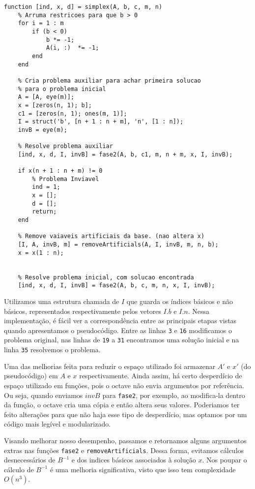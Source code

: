 \documentclass[12pt]{article}
\begin{document}
    \begin{lstlisting}
function [ind, x, d] = simplex(A, b, c, m, n)
    % Arruma restricoes para que b > 0
    for i = 1 : m
        if (b < 0)
            b *= -1;
            A(i, :)  *= -1;
        end
    end

    % Cria problema auxiliar para achar primeira solucao 
    % para o problema inicial
    A = [A, eye(m)];
    x = [zeros(n, 1); b];
    c1 = [zeros(n, 1); ones(m, 1)];
    I = struct('b', [n + 1 : n + m], 'n', [1 : n]);
    invB = eye(m);

    % Resolve problema auxiliar
    [ind, x, d, I, invB] = fase2(A, b, c1, m, n + m, x, I, invB);

    if x(n + 1 : n + m) != 0
        % Problema Inviavel
        ind = 1;
        x = [];
        d = [];
        return;
    end

    % Remove vaiaveis artificiais da base. (nao altera x)
    [I, A, invB, m] = removeArtificials(A, I, invB, m, n, b);
    x = x(1 : n);


    % Resolve problema inicial, com solucao encontrada
    [ind, x, d, I, invB] = fase2(A, b, c, m, n, x, I, invB);
    \end{lstlisting}

	
	Utilizamos uma estrutura chamada de $I$ que guarda os índices básicos e não básicos, representados respectivamente pelos vetores $I.b$ e $I.n$. Nessa implementação, é fácil ver a correspondência entre as principais etapas vistas quando apresentamos o pseudocódigo. Entre as linhas \texttt{3} e \texttt{16} modificamos o problema original, nas linhas de \texttt{19} a \texttt{31} encontramos uma solução inicial e na linha \texttt{35} resolvemos o problema.
    
    Uma das melhorias feita para reduzir o espaço utilizado foi armazenar $A'$ e $x'$ (do pseudocódigo) em $A$ e $x$ respectivamente. Ainda assim, há certo desperdício de espaço utilizado em funções, pois o octave não envia argumentos por referência. Ou seja, quando enviamos $invB$ para \texttt{fase2}, por exemplo, ao modifica-la dentro da função, o octave cria uma cópia e então altera seus valores. Poderiamos ter feito alterações para que não haja esse tipo de desperdício, mas optamos por um código mais legível e modularizado.
    
    Visando melhorar nosso desempenho, passamos e retornamos alguns argumentos extras nas funções \texttt{fase2} e \texttt{removeArtificials}. Dessa forma, evitamos cálculos desnecessários de $B^{-1}$ e dos indices básicos associados à solução $x$. Nos poupar o cálculo de $B^{-1}$ é uma melhoria significativa, visto que isso tem complexidade $O(n^3)$.
\end{document}
